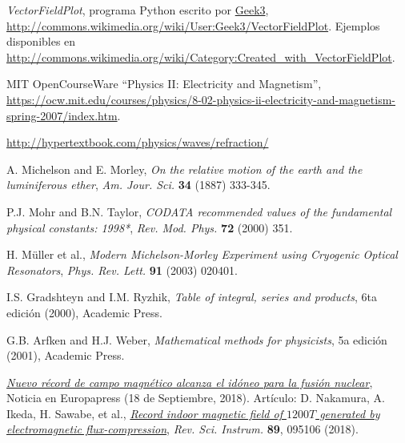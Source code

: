 \begin{thebibliography}{99}
 \textit{VectorFieldPlot}, programa Python escrito por \href{http://commons.wikimedia.org/wiki/User:Geek3}{Geek3}, \url{http://commons.wikimedia.org/wiki/User:Geek3/VectorFieldPlot}. Ejemplos disponibles en \url{http://commons.wikimedia.org/wiki/Category:Created_with_VectorFieldPlot}.


 MIT OpenCourseWare  ``Physics II: Electricity and Magnetism'', \url{https://ocw.mit.edu/courses/physics/8-02-physics-ii-electricity-and-magnetism-spring-2007/index.htm}.

\url{http://hypertextbook.com/physics/waves/refraction/}

 A. Michelson and E. Morley, {\it On the relative motion of the earth and the luminiferous ether}, {\sl Am. Jour. Sci.} {\bf 34} (1887) 333-345.

 P.J. Mohr and B.N. Taylor, {\it CODATA recommended values of the fundamental physical constants: 1998*}, {\sl Rev. Mod. Phys.} {\bf 72}
(2000) 351.

 H. M\"uller et al., {\it Modern Michelson-Morley
Experiment using Cryogenic Optical Resonators}, {\sl Phys. Rev. Lett.} {\bf 91} (2003) 020401.

 I.S. Gradshteyn and I.M. Ryzhik, {\it Table of integral, series and products}, 6ta edición (2000), Academic Press.

 G.B. Arfken and H.J. Weber, {\it Mathematical methods for physicists}, 5a  edición (2001), Academic Press.



\href{https://www.europapress.es/ciencia/laboratorio/noticia-nuevo-record-campo-magnetico-alcanza-idoneo-fusion-nuclear-20180918110647.html}{\textit{Nuevo récord de campo magnético alcanza el idóneo para la fusión nuclear}}, Noticia en Europapress (18 de Septiembre, 2018). Artículo: D. Nakamura, A. Ikeda, H. Sawabe, et al., \href{https://doi.org/10.1063/1.5044557}{\textit{Record indoor magnetic field of $1200 T$ generated by electromagnetic flux-compression}}, \textsl{Rev. Sci. Instrum.} \textbf{89}, 095106 (2018).




\end{thebibliography}
